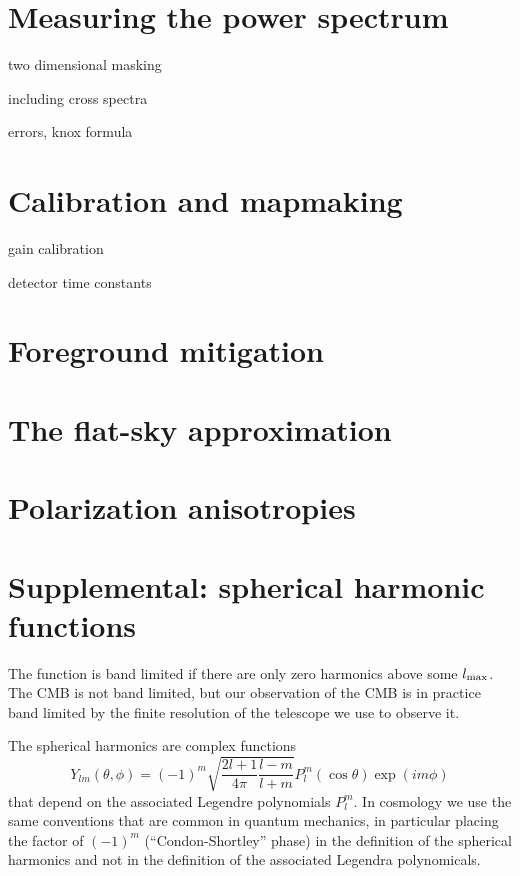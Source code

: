 \section{Measuring the power spectrum}

two dimensional masking



including cross spectra


errors, knox formula


\section{Calibration and mapmaking}

gain calibration

detector time constants


\section{Foreground mitigation}


\section{The flat-sky approximation}


\section{Polarization anisotropies}



\section*{Supplemental: spherical harmonic functions}

The function is band limited if there are only zero harmonics above some $l_{\rm max}$.  The CMB is not band limited, but our observation of the CMB is in practice band limited by the finite resolution of the telescope we use to observe it.

The spherical harmonics are complex functions
\begin{equation}
  Y_{lm}(\theta,\phi) = (-1)^m \sqrt{\frac{2 l + 1}{4\pi} \frac{l-m}{l+m}} P_l^m(\cos \theta) \exp(im\phi)
\end{equation}
that depend on the associated Legendre polynomials $P_l^m$.  In cosmology we use the same conventions that are common in quantum mechanics, in particular placing the factor of $(-1)^m$ (``Condon-Shortley'' phase) in the definition of the spherical harmonics and not in the definition of the associated Legendra polynomicals.

